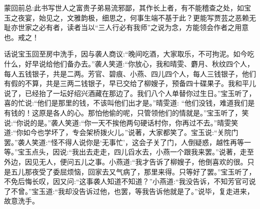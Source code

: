 

\begin{parag}
    \begin{note}蒙回前总:此书写世人之富贵子弟易流邪鄙，其作长上者，有不能稽查之处，如宝玉之夜宴，始见之，文雅韵极，细思之，何事生端不基于此？更能写贾芸之恶赖无耻亦世家之必有者，读者当以“三人行必有我师”之说为念，方能领会作者之用意也。戒之！\end{note}
\end{parag}


\begin{parag}
    话说宝玉回至房中洗手，因与袭人商议:“晚间吃酒，大家取乐，不可拘泥。如今吃什么，好早说给他们备办去。”袭人笑道:“你放心，我和晴雯、麝月、秋纹四个人，每人五钱银子，共是二两。芳官、碧痕、小燕、四儿四个人，每人三钱银子，他们有假的不算，共是三两二钱银子，早已交给了柳嫂子，预备四十碟果子。我和平儿说了，已经抬了一坛好绍兴酒藏在那边了。我们八个人单替你过生日。”宝玉听了，喜的忙说:“他们是那里的钱，不该叫他们出才是。”晴雯道: “他们没钱，难道我们是有钱的！这原是各人的心。那怕他偷的呢，只管领他们的情就是。”宝玉听了，笑说:“你说的是。”袭人笑道:“你一天不挨他两句硬话村你，你再过不去。”晴雯笑道:“你如今也学坏了，专会架桥拨火儿。”说著，大家都笑了。宝玉说:“关院门罢。”袭人笑道:“怪不得人说你是‘无事忙’，这会子关了门，人倒疑惑，越性再等一等。”宝玉点头，因说:“我出去走走，四儿舀水去，小燕一个跟我来罢。”说著，走至外边，因见无人，便问五儿之事。小燕道:“我才告诉了柳嫂子，他倒喜欢的很。只是五儿那夜受了委屈烦恼，回家去又气病了，那里来得。只等好了罢。”宝玉听了，不免后悔长叹，因又问:“这事袭人知道不知道？”小燕道:“我没告诉，不知芳官可说了不曾。”宝玉道:“我却没告诉过他，也罢，等我告诉他就是了。”说毕，复走进来，故意洗手。
\end{parag}


